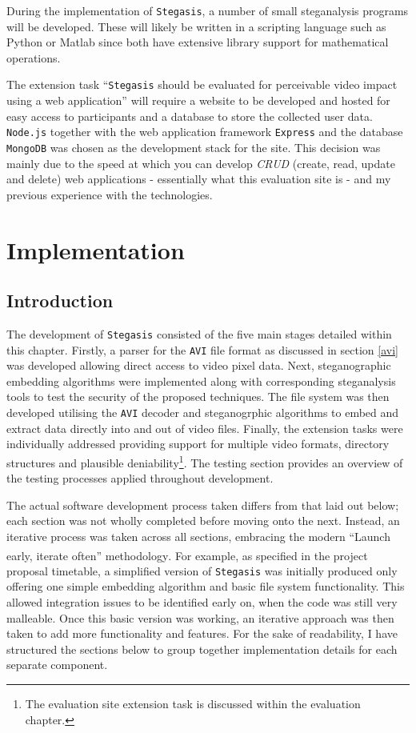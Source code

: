 \documentclass[paper=a4, fontsize=11pt,twoside]{scrartcl}
\numberwithin{table}{section}
\numberwithin{figure}{section}
\numberwithin{algorithm}{section}
\begin{document}
During the implementation of \texttt{Stegasis}, a number of small steganalysis programs will be developed. These will likely be written in a scripting language such as Python or Matlab since both have extensive library support for mathematical operations.

The extension task ``\texttt{Stegasis} should be evaluated for perceivable video impact using a web application'' will require a website to be developed and hosted for easy access to participants and a database to store the collected user data. \texttt{Node.js} together with the web application framework \texttt{Express} and the database \texttt{MongoDB} was chosen as the development stack for the site. This decision was mainly due to the speed at which you can develop \textit{CRUD} (create, read, update and delete) web applications - essentially what this evaluation site is - and my previous experience with the technologies.


\section{Implementation}

\subsection{Introduction}

The development of \texttt{Stegasis} consisted of the five main stages detailed within this chapter. Firstly, a parser for the \texttt{AVI} file format as discussed in section \ref{avi} was developed allowing direct access to video pixel data. Next, steganographic embedding algorithms were implemented along with corresponding steganalysis tools to test the security of the proposed techniques. The file system was then developed utilising the \texttt{AVI} decoder and steganogrphic algorithms to embed and extract data directly into and out of video files. Finally, the extension tasks were individually addressed providing support for multiple video formats, directory structures and plausible deniability\footnote{The evaluation site extension task is discussed within the evaluation chapter.}. The testing section provides an overview of the testing processes applied throughout development. 

The actual software development process taken differs from that laid out below; each section was not wholly completed before moving onto the next. Instead, an iterative process was taken across all sections, embracing the modern ``Launch early, iterate often'' methodology\textsuperscript{\cite{iterate}}. For example, as specified in the project proposal timetable, a simplified version of \texttt{Stegasis} was initially produced only offering one simple embedding algorithm and basic file system functionality. This allowed integration issues to be identified early on, when the code was still very malleable. Once this basic version was working, an iterative approach was then taken to add more functionality and features. For the sake of readability, I have structured the sections below to group together implementation details for each separate component.
\end{document}
